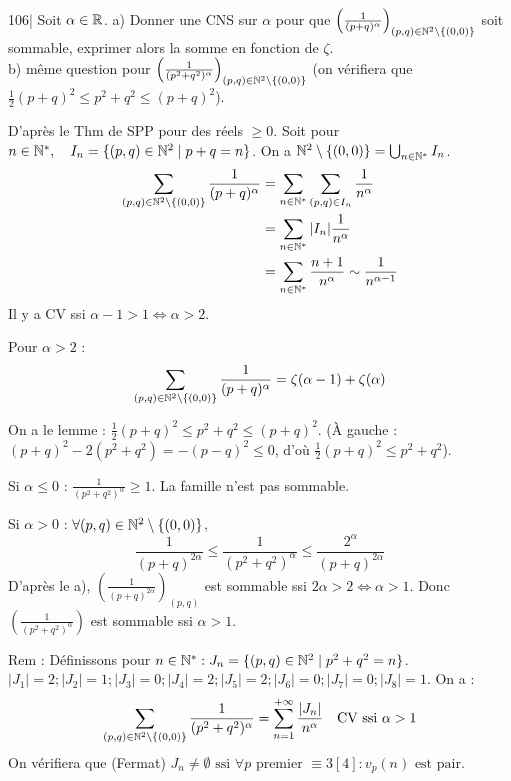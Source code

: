 \begin{statementbox}
106| Soit $\alpha \in \mathbb R$.
a) Donner une CNS sur $\alpha$ pour que $\left(\frac{1}{(p+q)^\alpha}\right)_{(p,q)\in \mathbb N^2 \setminus \{(0,0)\}}$ soit sommable, exprimer alors la somme en fonction de $\zeta$. \\
b) même question pour $\left(\frac{1}{(p^2+q^2)^\alpha}\right)_{(p,q)\in \mathbb N^2 \setminus \{(0,0)\}}$ (on vérifiera que $\frac{1}{2}(p+q)^2 \leq p^2+q^2 \leq (p+q)^2$).
\end{statementbox}

\begin{solution}
D'après le Thm de SPP pour des réels $\geq 0$.
Soit pour $n \in \mathbb N^*, \quad I_n = \{(p,q) \in \mathbb N^2 \mid p+q=n\}$.
On a $\mathbb N^2 \setminus \{(0,0)\} = \bigcup_{n \in \mathbb N^*} I_n$.
\begin{align*}
\sum_{(p,q)\in \mathbb N^2 \setminus \{(0,0)\}} \frac{1}{(p+q)^\alpha} &= \sum_{n \in \mathbb N^*} \sum_{(p,q) \in I_n} \frac{1}{n^\alpha} \\
&= \sum_{n \in \mathbb N^*} |I_n| \frac{1}{n^\alpha} \\
&= \sum_{n \in \mathbb N^*} \frac{n+1}{n^\alpha} \sim \frac{1}{n^{\alpha-1}}
\end{align*}
Il y a CV ssi $\alpha - 1 > 1 \iff \boxed{\alpha > 2}$.

Pour $\alpha > 2$ : 
\[ \sum_{(p,q) \in \mathbb N^2 \setminus \{(0,0)\}} \frac{1}{(p+q)^\alpha} = \zeta(\alpha-1) + \zeta(\alpha) \]

On a le lemme : $\frac{1}{2}(p+q)^2 \leq p^2+q^2 \leq (p+q)^2$.
(À gauche : $(p+q)^2 - 2(p^2+q^2) = -(p-q)^2 \leq 0$, d'où $\frac{1}{2}(p+q)^2 \leq p^2+q^2$).

Si $\alpha \leq 0$ : 
$\frac{1}{(p^2+q^2)^\alpha} \geq 1$. La famille n'est pas sommable.

Si $\alpha > 0$ : 
$\forall (p,q) \in \mathbb N^2 \setminus \{(0,0)\}$,
\[ \frac{1}{(p+q)^{2\alpha}} \leq \frac{1}{(p^2+q^2)^\alpha} \leq \frac{2^\alpha}{(p+q)^{2\alpha}} \]
D'après le a), $\left(\frac{1}{(p+q)^{2\alpha}}\right)_{(p,q)}$ est sommable ssi $2\alpha > 2 \iff \boxed{\alpha > 1}$.
Donc $\left(\frac{1}{(p^2+q^2)^\alpha}\right)$ est sommable ssi $\alpha > 1$.

\begin{remarkbox}
Rem : Définissons pour $n \in \mathbb N^* : J_n = \{(p,q) \in \mathbb N^2 \mid p^2+q^2=n\}$.
$|J_1|=2 ; |J_2|=1 ; |J_3|=0 ; |J_4|=2 ; |J_5|=2 ; |J_6|=0 ; |J_7|=0 ; |J_8|=1$.
On a :
\[ \sum_{(p,q)\in \mathbb N^2 \setminus \{(0,0)\}} \frac{1}{(p^2+q^2)^\alpha} = \sum_{n=1}^{+\infty} \frac{|J_n|}{n^\alpha} \quad \text{CV ssi } \alpha > 1 \]
On vérifiera que (Fermat) $J_n \neq \emptyset \text{ ssi } \forall p \text{ premier } \equiv 3 [4] : v_p(n) \text{ est pair}$.
\end{remarkbox}
\end{solution}

